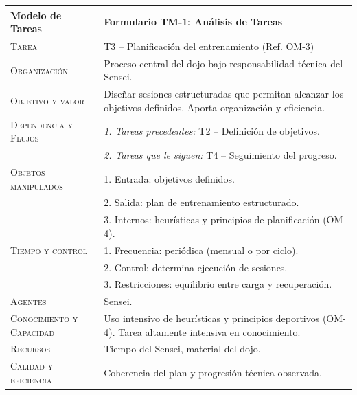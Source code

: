\documentclass[12pt,a4paper,twoside,spanish]{article}      %
\begin{document}
        \begin{table}[H]
            \scriptsize
            \begin{tabularx}{\textwidth}{|l|X|} \hline       
                \textbf{Modelo de Tareas} & \textbf{Formulario TM-1: Análisis de Tareas} \\ \hline\hline
                
                \textsc{Tarea} & T3 – Planificación del entrenamiento (Ref. OM-3) \\ \hline
                
                \textsc{Organización}  & Proceso central del dojo bajo responsabilidad técnica del Sensei. \\ \hline
                
                \textsc{Objetivo y valor} & Diseñar sesiones estructuradas que permitan alcanzar los objetivos definidos. Aporta organización y eficiencia. \\ \hline
                
                \textsc{Dependencia y Flujos} 
                & \textit{1. Tareas precedentes:} T2 – Definición de objetivos.\\
                & \textit{2. Tareas que le siguen:} T4 – Seguimiento del progreso. \\ \hline
                
                \textsc{Objetos manipulados} 
                & 1. Entrada: objetivos definidos.\\
                & 2. Salida: plan de entrenamiento estructurado.\\
                & 3. Internos: heurísticas y principios de planificación (OM-4). \\ \hline
                
                \textsc{Tiempo y control} 
                & 1. Frecuencia: periódica (mensual o por ciclo).\\
                & 2. Control: determina ejecución de sesiones.\\
                & 3. Restricciones: equilibrio entre carga y recuperación. \\ \hline
                
                \textsc{Agentes} & Sensei. \\ \hline
                
                \textsc{Conocimiento y Capacidad} & Uso intensivo de heurísticas y principios deportivos (OM-4). Tarea altamente intensiva en conocimiento. \\ \hline
                
                \textsc{Recursos} & Tiempo del Sensei, material del dojo. \\ \hline
                
                \textsc{Calidad y eficiencia} & Coherencia del plan y progresión técnica observada. \\ \hline
            \end{tabularx}
            \label{tab.TM1-T3}
          \end{table}
\end{document}
